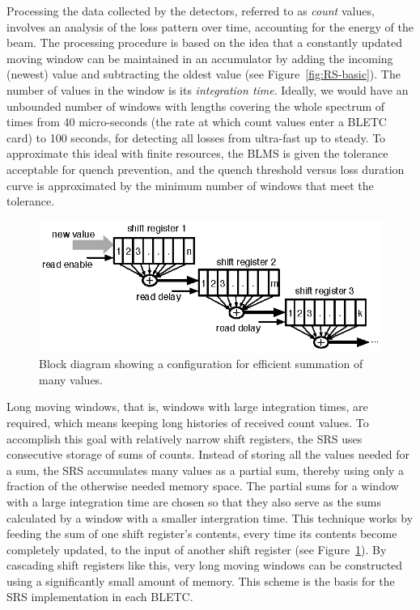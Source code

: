 \documentclass{llncs}
\begin{document}
Processing the data collected by the detectors, referred to as \emph{count} values, involves an analysis of the loss pattern over time, accounting for the energy of the beam.
The processing procedure is based on the idea that a constantly updated moving window can be maintained in an accumulator by adding the incoming (newest) value and subtracting the oldest value (see Figure~\ref{fig:RS-basic}).
The number of values in the window is its \emph{integration time}.
Ideally, we would have an unbounded number of windows with lengths covering the whole spectrum of times from 40 micro-seconds (the rate at which count values enter a BLETC card) to 100 seconds, for detecting all losses from ultra-fast up to steady.
To approximate this ideal with finite resources, the BLMS is given the tolerance acceptable for quench prevention, and the quench threshold versus loss duration curve is approximated by the minimum number of windows that meet the tolerance.

\begin{figure}[t]
  \centering \includegraphics{SRS-basic.eps}
   \caption{Block diagram showing a configuration for efficient summation of many values.}
  \label{fig:SRS-basic}
\end{figure}

Long moving windows, that is, windows with large integration times, are required, which means keeping long histories of received count values.
To accomplish this goal with relatively narrow shift registers, the SRS uses consecutive storage of sums of counts.
Instead of storing all the values needed for a sum, the SRS accumulates many values as a partial sum, thereby using only a fraction of the otherwise needed memory space.
The partial sums for a window with a large integration time are chosen so that they also serve as the sums calculated by a window with a smaller intergration time.
This technique works by feeding the sum of one shift register's contents, every time its contents become completely updated, to the input of another shift register (see Figure~\ref{fig:SRS-basic}).
By cascading shift registers like this, very long moving windows can be constructed using a significantly small amount of memory.
This scheme is the basis for the SRS implementation in each BLETC.
\end{document}

